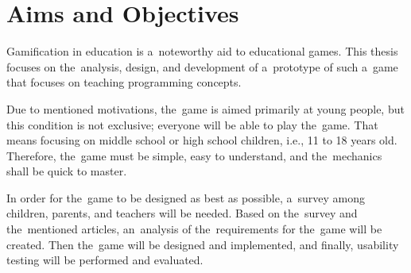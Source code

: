 \section{Aims and Objectives}

Gamification in education is a~noteworthy aid to educational games.
This thesis focuses on the~analysis, design, and development of a~prototype of such a~game
that focuses on teaching programming concepts.

Due to mentioned motivations, the~game is aimed primarily at young people, but this condition is not exclusive; everyone will be able to play the~game.
That means focusing on middle school or high school children, i.e., 11 to 18 years old.
Therefore, the~game must be simple, easy to understand, and the~mechanics shall be quick to master.

In order for the~game to be designed as best as possible, a~survey among children, parents, and teachers will be needed.
Based on the~survey and the~mentioned articles, an~analysis of the~requirements for the~game will be created.
Then the~game will be designed and implemented, and finally, usability testing will be performed and evaluated.
